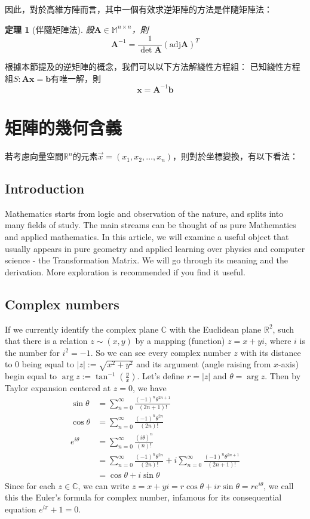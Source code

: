 \documentclass[12pt]{article}
\newcommand{\adj}{\mathrm{adj}}
\newtheorem*{theorem}{定理}
\begin{document}
    因此，對於高維方陣而言，其中一個有效求逆矩陣的方法是伴隨矩陣法：

    \begin{theorem}[伴隨矩陣法]
        設$\mathbf{A}\in\mathbb{M}^{n\times n}$，則$$\mathbf{A}^{-1}=\frac{1}{\det{\mathbf{A}}}(\adj{\mathbf{A}})^T$$
    \end{theorem}

    根據本節提及的逆矩陣的概念，我們可以以下方法解綫性方程組：
    已知綫性方程組$S:\mathbf{Ax}=\mathbf{b}$有唯一解，則$$\mathbf{x}=\mathbf{A}^{-1}\mathbf{b}$$

    \newpage
    \section*{矩陣的幾何含義}

    若考慮向量空間$\mathbb{R}^n$的元素$\vec{x}=(x_1,x_2,\dots,x_n)$，則對於坐標變換，有以下看法：

    \subsection*{Introduction}
    Mathematics starts from logic and observation of the nature, and splits into many fields of study. The main streams can be thought of as pure Mathematics and applied mathematics. In this article, we will examine a useful object that usually appears in pure geometry and applied learning over physics and computer science - the Transformation Matrix. We will go through its meaning and the derivation. More exploration is recommended if you find it useful.
    \subsection*{Complex numbers}
    If we currently identify the complex plane $\mathbb{C}$ with the Euclidean plane $\mathbb{R}^2$, such that there is a relation $z\sim(x,y)$ by a mapping (function) $z=x+yi$, where $i$ is the number for $i^2=-1$. So we can see every complex number $z$ with its distance to 0 being equal to $|z|:=\sqrt{x^2+y^2}$ and its argument (angle raising from $x$-axis) begin equal to $\arg{z}:=\tan^{-1}(\frac{y}{x})$. Let's define $r=|z|$ and $\theta=\arg{z}$. Then by Taylor expansion centered at $z=0$, we have 
    \begin{align*}
        \sin{\theta}&=\sum_{n=0}^\infty\frac{(-1)^n\theta^{2n+1}}{(2n+1)!}\\
        \cos{\theta}&=\sum_{n=0}^\infty\frac{(-1)^n\theta^{2n}}{(2n)!}\\
        e^{i\theta}&=\sum_{n=0}^\infty\frac{(i\theta)^{n}}{(n)!}\\
        &=\sum_{n=0}^\infty\frac{(-1)^n\theta^{2n}}{(2n)!}+i\sum_{n=0}^\infty\frac{(-1)^n\theta^{2n+1}}{(2n+1)!}\\
        &=\cos{\theta}+i\sin{\theta}
    \end{align*}
    Since for each $z\in \mathbb{C}$, we can write $z=x+yi=r\cos{\theta}+ir\sin{\theta}=re^{i\theta}$, we call this the Euler's formula for complex number, infamous for its consequential equation $e^{i\pi}+1=0$.
\end{document}
